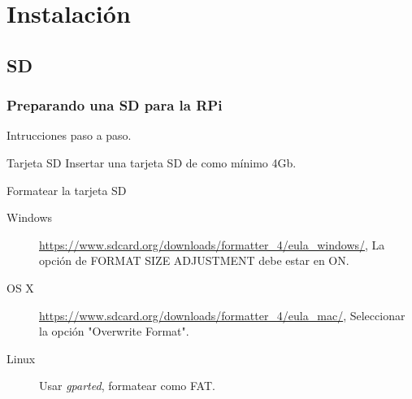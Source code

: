 \documentclass[10pt,colorlinks]{beamer}
\begin{document}
\section{Instalación}

\subsection{SD}
\begin{frame}[allowframebreaks]\frametitle{Preparando una SD para la RPi}
Intrucciones paso a paso.

\begin{block}{Tarjeta SD}
Insertar una tarjeta SD de como mínimo 4Gb.
\end{block}

\begin{block}{Formatear la tarjeta SD}

\begin{description}

    \item[Windows] \href{https://www.sdcard.org/downloads/formatter\_4/eula\_windows/}{https://www.sdcard.org/downloads/formatter\_4/eula\_windows/}, La opción de FORMAT SIZE ADJUSTMENT debe estar en ON. 

    \item[OS X] \href{https://www.sdcard.org/downloads/forma    tter\_4/eula\_mac/}{https://www.sdcard.org/downloads/formatter\_4/eula\_mac/}, Seleccionar la opción "Overwrite Format".

    \item[Linux] Usar \emph{gparted}, formatear como FAT.  

\end{description}

\end{block}



\end{frame}
\end{document}
